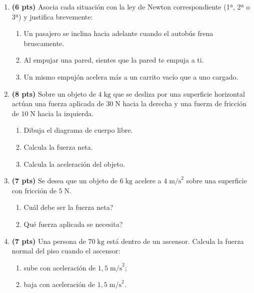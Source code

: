 \documentclass[12pt, letterpaper]{article}
\begin{document}
\begin{enumerate}[leftmargin=*]
  \item \textbf{(6 pts)} Asocia cada situación con la ley de Newton correspondiente (1ª, 2ª o 3ª) y justifica brevemente:
        \begin{enumerate}[label=\alph*)]
          \item Un pasajero se inclina hacia adelante cuando el autobús frena bruscamente.
          \item Al empujar una pared, sientes que la pared te empuja a ti.
          \item Un mismo empujón acelera más a un carrito vacío que a uno cargado.
        \end{enumerate}

  \item \textbf{(8 pts)} Sobre un objeto de $4\;\text{kg}$ que se desliza por una superficie horizontal actúan una fuerza aplicada de $30\;\text{N}$ hacia la derecha y una fuerza de fricción de $10\;\text{N}$ hacia la izquierda.
        \begin{enumerate}[label=\alph*)]
          \item Dibuja el diagrama de cuerpo libre.
          \item Calcula la fuerza neta.
          \item Calcula la aceleración del objeto.
        \end{enumerate}

  \item \textbf{(7 pts)} Se desea que un objeto de $6\;\text{kg}$ acelere a $4\;\text{m/s}^2$ sobre una superficie con fricción de $5\;\text{N}$.
        \begin{enumerate}[label=\alph*)]
          \item \textquestiondown Cuál debe ser la fuerza neta?
          \item \textquestiondown Qué fuerza aplicada se necesita?
        \end{enumerate}

  \item \textbf{(7 pts)} Una persona de $70\;\text{kg}$ está dentro de un ascensor. Calcula la fuerza normal del piso cuando el ascensor:
        \begin{enumerate}[label=\alph*)]
          \item sube con aceleración de $1{,}5\;\text{m/s}^2$;
          \item baja con aceleración de $1{,}5\;\text{m/s}^2$.
        \end{enumerate}
\end{enumerate}
\end{document}

